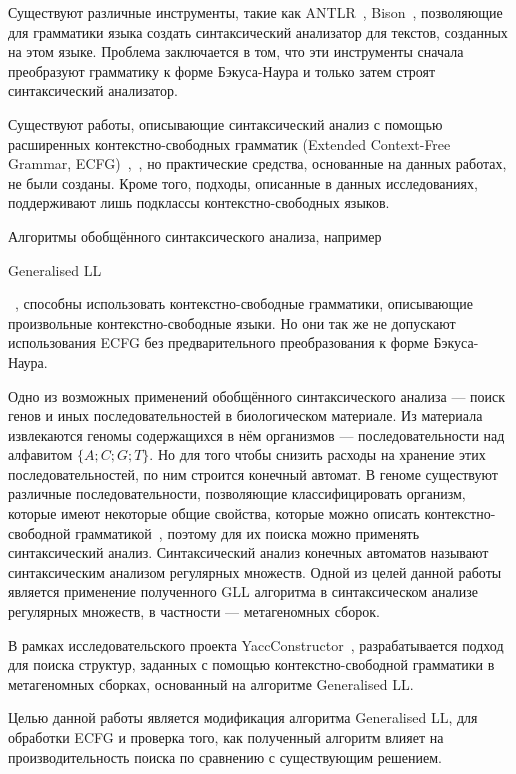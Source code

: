 \documentclass[12pt]{matmex-diploma-custom}
\begin{document}
	Существуют различные инструменты, такие как ANTLR~\cite{ANTLR}, Bison~\cite{Bison},
    позволяющие для грамматики языка создать синтаксический анализатор для текстов, созданных на этом языке.
	Проблема заключается в том, что эти инструменты
	сначала преобразуют грамматику к форме Бэкуса-Наура и только затем
	строят синтаксический анализатор.
	
	Существуют работы, описывающие синтаксический анализ с помощью расширенных
	контекстно-свободных грамматик (Extended Context-Free Grammar, ECFG)~\cite{ELRR},~\cite{lee1997characterization},
	но практические средства, основанные на данных работах, не были созданы. Кроме того, подходы, описанные
	в данных исследованиях, поддерживают лишь подклассы контекстно-свободных языков.
	
	Алгоритмы обобщённого синтаксического анализа, например
    \begin{english} Generalised LL \end{english}~\cite{scott2010gll}, 
	способны использовать контекстно-свободные грамматики, описывающие произвольные 
	контекстно-свободные языки. Но они так же не допускают использования ECFG 
	без предварительного преобразования к форме Бэкуса-Наура.
	
	Одно из возможных применений обобщённого синтаксического анализа --- поиск генов и иных последовательностей в биологическом материале. 
	Из материала извлекаются геномы содержащихся в нём организмов --- последовательности над алфавитом $\{A;C; G; T\}$.
    Но для того чтобы снизить расходы на хранение этих последовательностей, по ним строится конечный автомат.
    В геноме существуют различные последовательности, позволяющие классифицировать организм, которые имеют некоторые общие свойства, которые можно описать 
    контекстно-свободной грамматикой~\cite{Anderson2013}, поэтому для их поиска можно применять синтаксический анализ.
    Синтаксический анализ конечных автоматов называют 
    синтаксическим анализом регулярных множеств. Одной из целей данной работы является применение
    полученного GLL алгоритма в
	синтаксическом анализе регулярных множеств, в частности --- метагеномных сборок.
	
	В рамках исследовательского проекта YaccConstructor~\cite{YaccConstructor},
	разрабатывается подход для поиска структур, заданных с помощью контекстно-свободной
	грамматики в метагеномных сборках, основанный на алгоритме Generalised LL.
	
	Целью данной работы является модификация алгоритма Generalised LL, для обработки
    ECFG и проверка того, как полученный 
    алгоритм влияет на производительность поиска по сравнению с существующим решением.
\end{document}
